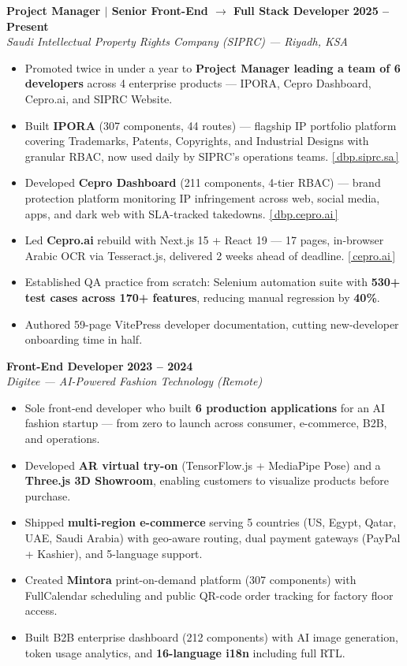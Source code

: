 \documentclass[10pt, letterpaper]{article}
\newenvironment{highlights}{
    \begin{itemize}[topsep=0.10cm, parsep=0.07cm, partopsep=0pt, itemsep=0pt, leftmargin=10pt]
}{
    \end{itemize}
}
\begin{document}
\textbf{Project Manager $\vert$ Senior Front-End $\rightarrow$ Full Stack Developer} \hfill \textbf{2025 – Present} \\
\textit{Saudi Intellectual Property Rights Company (SIPRC) — Riyadh, KSA} \\
\begin{highlights}
    \item Promoted twice in under a year to \textbf{Project Manager leading a team of 6 developers} across 4 enterprise products — IPORA, Cepro Dashboard, Cepro.ai, and SIPRC Website.
    \item Built \textbf{IPORA} (307 components, 44 routes) — flagship IP portfolio platform covering Trademarks, Patents, Copyrights, and Industrial Designs with granular RBAC, now used daily by SIPRC's operations teams. \href{https://dbp.siprc.sa}{[\,dbp.siprc.sa\,]}
    \item Developed \textbf{Cepro Dashboard} (211 components, 4-tier RBAC) — brand protection platform monitoring IP infringement across web, social media, apps, and dark web with SLA-tracked takedowns. \href{https://dbp.cepro.ai}{[\,dbp.cepro.ai\,]}
    \item Led \textbf{Cepro.ai} rebuild with Next.js 15 + React 19 — 17 pages, in-browser Arabic OCR via Tesseract.js, delivered 2 weeks ahead of deadline. \href{https://www.cepro.ai/en}{[\,cepro.ai\,]}
    \item Established QA practice from scratch: Selenium automation suite with \textbf{530+ test cases across 170+ features}, reducing manual regression by \textbf{40\%}.
    \item Authored 59-page VitePress developer documentation, cutting new-developer onboarding time in half.
\end{highlights}

\textbf{Front-End Developer} \hfill \textbf{2023 – 2024} \\
\textit{Digitee — AI-Powered Fashion Technology (Remote)} \\
\begin{highlights}
    \item Sole front-end developer who built \textbf{6 production applications} for an AI fashion startup — from zero to launch across consumer, e-commerce, B2B, and operations.
    \item Developed \textbf{AR virtual try-on} (TensorFlow.js + MediaPipe Pose) and a \textbf{Three.js 3D Showroom}, enabling customers to visualize products before purchase.
    \item Shipped \textbf{multi-region e-commerce} serving 5 countries (US, Egypt, Qatar, UAE, Saudi Arabia) with geo-aware routing, dual payment gateways (PayPal + Kashier), and 5-language support.
    \item Created \textbf{Mintora} print-on-demand platform (307 components) with FullCalendar scheduling and public QR-code order tracking for factory floor access.
    \item Built B2B enterprise dashboard (212 components) with AI image generation, token usage analytics, and \textbf{16-language i18n} including full RTL.
\end{highlights}
\end{document}
